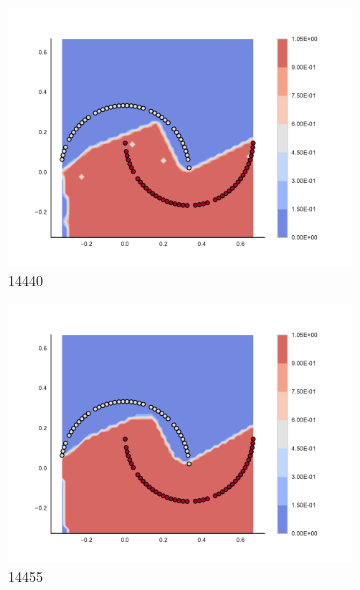 \begin{figure}[h]
\begin{subfigure}[b]{0.09\textwidth}
    \includegraphics[clip, trim=2.35cm 1.75cm 4.5cm 0cm,width=\textwidth]{img/convergence/14440.pdf}
    \caption{14440}
    \label{fig:convergence_14440}
\end{subfigure}
%
\begin{subfigure}[b]{0.09\textwidth}
    \includegraphics[clip, trim=2.35cm 1.75cm 4.5cm 0cm,width=\textwidth]{img/convergence/14455.pdf}
    \caption{14455}
    \label{fig:convergence_14455}
\end{subfigure}
%
\begin{subfigure}[b]{0.09\textwidth}

\end{subfigure}
\end{figure}
